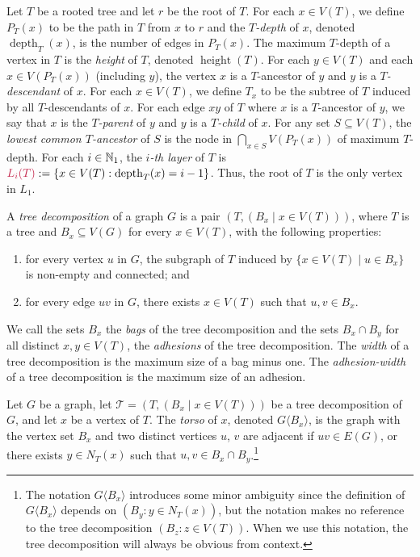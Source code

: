 \documentclass{patmorin}
\makeatletter
\DeclareMathOperator{\height}{height}
\newcommand{\torso}[2]{{#1}\langle{#2}\rangle}
\DeclareMathOperator{\depth}{depth}
\newcommand{\defin}[1]{\emph{\textcolor{brightmaroon}{#1}}}
\def\mathcolor#1#{\@mathcolor{#1}}
\def\@mathcolor#1#2#3{%
  \protect\leavevmode
  \begingroup
    \color#1{#2}#3%
  \endgroup
}
\newcommand{\mathdefin}[1]{\mathcolor{brightmaroon}{#1}}
\newcommand{\calT}{\mathcal{T}}
\makeatother
\begin{document}
  Let $T$ be a rooted tree and let $r$ be the root of $T$. For each $x\in V(T)$, we define \defin{$P_T(x)$} to be the path in $T$ from $x$ to $r$ and the \defin{$T$-depth} of $x$, denoted \defin{$\depth_T(x)$}, is the number of edges in $P_T(x)$.
  The maximum $T$-depth of a vertex in $T$ is the \defin{height} of $T$, denoted \defin{$\height(T)$}.
  For each $y\in V(T)$ and each $x\in V(P_T(x))$ (including $y$),  the vertex $x$ is a $T$-ancestor of $y$ and $y$ is a \defin{$T$-descendant} of $x$.  For each $x\in V(T)$, we define \defin{$T_x$} to be the subtree of $T$ induced by all $T$-descendants of $x$.
  For each edge $xy$ of $T$ where $x$ is a $T$-ancestor of $y$, we say that $x$ is the \defin{$T$-parent} of $y$ and $y$ is a \defin{$T$-child} of $x$.  For any set $S\subseteq V(T)$, the \defin{lowest common $T$-ancestor} of $S$ is the node in $\bigcap_{x\in S} V(P_T(x))$ of maximum $T$-depth.
  For each $i\in\mathbb{N}_1$, the \defin{$i$-th layer} of $T$ is $\mathdefin{L_i(T)}:=\{x\in V(T):\depth_T(x)=i-1\}$.
  Thus, the root of $T$ is the only vertex in $L_1$.



A \defin{tree decomposition} of a graph $G$ is a pair $(T,(B_x \mid x \in V(T)))$,
where $T$ is a tree and $B_x \subseteq V(G)$ for every $x \in V(T)$, with the
following properties:
\begin{enumerate}
	\item for every vertex $u$ in $G$, the subgraph of $T$ induced by $\{x \in V(T) \mid u \in B_x\}$ is non-empty and connected; and
	\item for every edge $uv$ in $G$, there exists $x\in V(T)$ such that $u,v\in B_x$.
\end{enumerate}


We call the sets $B_x$ the \defin{bags} of the tree decomposition and the sets $B_x\cap B_y$ for all distinct $x,y\in V(T)$, the \defin{adhesions} of the tree decomposition.
The \defin{width} of a tree decomposition is the maximum size of a bag minus one.
The \defin{adhesion-width} of a tree decomposition is the maximum size of an adhesion.

Let $G$ be a graph,
let $\calT=(T,(B_x \mid x\in V(T)))$ be a tree decomposition of $G$, and let $x$ be a vertex of $T$.
The \defin{torso} of $x$, denoted \defin{$\torso{G}{B_x}$},
 is the graph with the vertex set $B_x$ and two distinct vertices $u$, $v$ are adjacent
  if $uv \in E(G)$, or there exists $y \in N_T(x)$ such that $u,v \in B_x \cap B_y$.\footnote{The notation $\torso{G}{B_x}$ introduces some minor ambiguity since the definition of $\torso{G}{B_x}$ depends on $(B_y:y\in N_T(x))$, but the notation makes no reference to the tree decomposition $(B_z:z\in V(T))$.  When we use this notation, the tree decomposition will always be obvious from context.}
\end{document}

